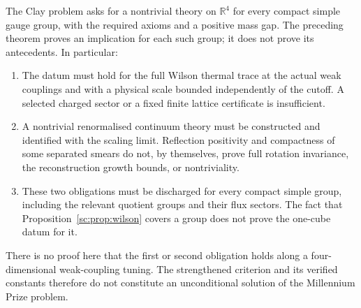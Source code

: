 The Clay problem asks for a nontrivial theory on $\mathbb R^4$ for every
compact simple gauge group, with the required axioms and a positive mass
gap. The preceding theorem proves an implication for each such group;
it does not prove its antecedents. In particular:
\begin{enumerate}[leftmargin=*]
\item The datum must hold for the full Wilson thermal trace at the
actual weak couplings and with a physical scale bounded independently
of the cutoff. A selected charged sector or a fixed finite lattice
certificate is insufficient.
\item A nontrivial renormalised continuum theory must be constructed and
identified with the scaling limit. Reflection positivity and compactness
of some separated smears do not, by themselves, prove full rotation
invariance, the reconstruction growth bounds, or nontriviality.
\item These two obligations must be discharged for every compact simple
group, including the relevant quotient groups and their flux sectors.
The fact that Proposition~\ref{sc:prop:wilson} covers a group does not
prove the one-cube datum for it.
\end{enumerate}
There is no proof here that the first or second obligation holds along a
four-dimensional weak-coupling tuning. The strengthened criterion and
its verified constants therefore do not constitute an unconditional
solution of the Millennium Prize problem.
